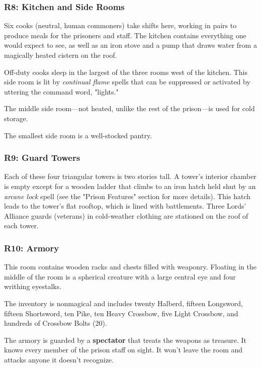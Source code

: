 \documentclass[10pt,a4paper,twoside,bg=print,twocolumn,openany,nodeprecatedcode]{dndbook}
\begin{document}
\subsubsection{R8: Kitchen and Side Rooms}
Six cooks (neutral, human commoners) take shifts here, working in pairs to produce meals for the prisoners and staff. The kitchen contains everything one would expect to see, as well as an iron stove and a pump that draws water from a magically heated cistern on the roof.

Off-duty cooks sleep in the largest of the three rooms west of the kitchen. This side room is lit by \textit{continual flame} spells that can be suppressed or activated by uttering the command word, "lights."

The middle side room—not heated, unlike the rest of the prison—is used for cold storage.

The smallest side room is a well-stocked pantry.

\subsubsection{R9: Guard Towers}
Each of these four triangular towers is two stories tall. A tower's interior chamber is empty except for a wooden ladder that climbs to an iron hatch held shut by an \textit{arcane lock} spell (see the "Prison Features" section for more details). This hatch leads to the tower's flat rooftop, which is lined with battlements. Three Lords' Alliance guards (veterans) in cold-weather clothing are stationed on the roof of each tower.

\subsubsection{R10: Armory}
\begin{DndReadAloud}{}
This room contains wooden racks and chests filled with weaponry. Floating in the middle of the room is a spherical creature with a large central eye and four writhing eyestalks.

\end{DndReadAloud}

The inventory is nonmagical and includes twenty Halberd, fifteen Longsword, fifteen Shortsword, ten Pike, ten Heavy Crossbow, five Light Crossbow, and hundreds of Crossbow Bolts (20).

The armory is guarded by a \textbf{spectator} that treats the weapons as treasure. It knows every member of the prison staff on sight. It won't leave the room and attacks anyone it doesn't recognize.
\end{document}
